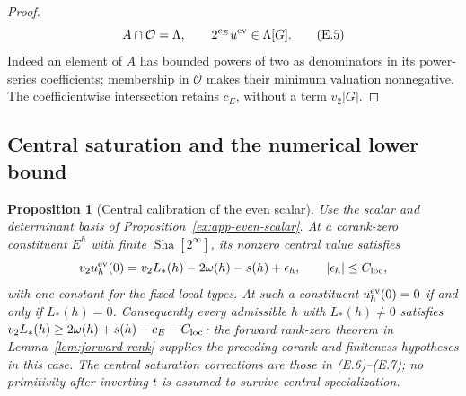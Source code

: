 \documentclass[11pt]{article}
\newtheorem{proposition}[theorem]{Proposition}
\theoremstyle{definition}
\theoremstyle{remark}
\providecommand{\mathscr}[1]{\mathcal{#1}}
\newcommand{\Sha}{\operatorname{Sha}}
\begin{document}
\begin{proof}
\[
              A\cap\mathscr O=\Lambda,\qquad
                  2^{c_E}u^{\rm ev}\in\Lambda[G].                 \tag{E.5}
\]
Indeed an element of $A$ has bounded powers of two as denominators
in its power-series coefficients; membership in $\mathscr O$ makes
their minimum valuation nonnegative. The coefficientwise intersection
retains $c_E$, without a term $v_2|G|$.
\end{proof}

\subsection{Central saturation and the numerical lower bound}
\begin{proposition}[Central calibration of the even scalar]\label{ex:app-central-calibration}
Use the scalar and determinant basis of
Proposition~\ref{ex:app-even-scalar}. At a corank-zero constituent
$E^h$ with finite $\Sha[2^\infty]$, its nonzero central value satisfies
\[
 v_2u_h^{\rm ev}(0)=v_2L_*(h)-2\omega(h)-s(h)+\epsilon_h,
 \qquad |\epsilon_h|\le C_{\rm loc},
\]
with one constant for the fixed local types. At such a constituent
$u_h^{\rm ev}(0)=0$ if and only if $L_*(h)=0$.
Consequently every admissible $h$ with $L_*(h)\ne0$ satisfies
$v_2L_*(h)\ge2\omega(h)+s(h)-c_E-C_{\rm loc}$: the forward
rank-zero theorem in Lemma~\ref{lem:forward-rank} supplies the
preceding corank and finiteness hypotheses in this case. The central saturation corrections are those
in (E.6)--(E.7); no primitivity after inverting $t$ is assumed to
survive central specialization.
\end{proposition}
\end{document}
